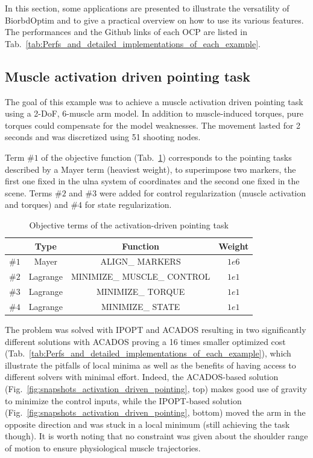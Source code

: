 In this section, some applications are presented to illustrate the versatility of BiorbdOptim and to give a practical overview on how to use its various features.
The performances and the Github links of each OCP are listed in Tab.~\ref{tab:Perfs_and_detailed_implementations_of_each_example}.


\subsection{Muscle activation driven pointing task}

The goal of this example was to achieve a muscle activation driven pointing task using a 2-DoF, 6-muscle arm model. 
In addition to muscle-induced torques, pure torques could compensate for the model weaknesses.
The movement lasted for 2 seconds and was discretized using 51 shooting nodes.

Term $\#1$ of the objective function (Tab.~\ref{tab:Muscle_activation_driven_pointing_task}) corresponds to the pointing tasks described by a Mayer term (heaviest weight), to superimpose two markers, the first one fixed in the ulna system of coordinates and the second one fixed in the scene.
Terms $\#2$ and $\#3$ were added for control regularization (muscle activation and torques) and $\#4$ for state regularization. 

%

%
\begin{table}[h!]
\caption{\small Objective terms of the activation-driven pointing task}
\label{tab:Muscle_activation_driven_pointing_task}
\centering
\begin{tabular}{c c c c}
\toprule 
& Type & Function & Weight \\ 
\midrule
$\#1$ & Mayer & ALIGN\_ MARKERS & $1e6$ \\ 
\midrule
$\#2$ & Lagrange & MINIMIZE\_ MUSCLE\_ CONTROL & $1e1$ \\ 
\midrule
$\#3$ & Lagrange & MINIMIZE\_ TORQUE & $1e1$ \\ 
\midrule
$\#4$ & Lagrange & MINIMIZE\_ STATE & $1e1$ \\
\bottomrule
\end{tabular}
\end{table}
%

%
The problem was solved with IPOPT and ACADOS resulting in two significantly different solutions with ACADOS proving a 16 times smaller optimized cost (Tab.~\ref{tab:Perfs_and_detailed_implementations_of_each_example}), which illustrate the pitfalls of local minima as well as the benefits of having access to different solvers with minimal effort.  
Indeed, the ACADOS-based solution (Fig.~\ref{fig:snapshots_activation_driven_pointing}, top) makes good use of gravity to minimize the control inputs, while the IPOPT-based solution (Fig.~\ref{fig:snapshots_activation_driven_pointing}, bottom) moved the arm in the opposite direction and was stuck in a local minimum (still achieving the task though). 
It is worth noting that no constraint was given about the shoulder range of motion to ensure physiological muscle trajectories. 
 
